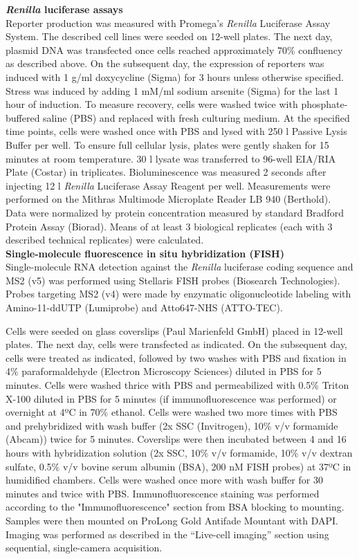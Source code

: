 \textbf{\textit{Renilla} luciferase assays} \\
Reporter production was measured with Promega’s \textit{Renilla} Luciferase Assay System.
The described cell lines were seeded on 12-well plates.
The next day, plasmid DNA was transfected once cells reached approximately 70\% confluency as described above.
On the subsequent day, the expression of reporters was induced with 1 \textmu g/ml
    doxycycline (Sigma) for 3 hours unless otherwise specified.
Stress was induced by adding 1 mM/ml sodium arsenite (Sigma) for the last 1 hour of induction.
To measure recovery, cells were washed twice with phosphate-buffered saline (PBS) and replaced with fresh culturing medium.
At the specified time points, cells were washed once with PBS and lysed with 250 \textmu l Passive Lysis Buffer per well.
To ensure full cellular lysis, plates were gently shaken for 15 minutes at room temperature.
30 \textmu l lysate was transferred to 96-well EIA/RIA Plate (Costar) in triplicates.
Bioluminescence was measured 2 seconds after injecting 12 \textmu l \textit{Renilla} Luciferase Assay Reagent per well.
Measurements were performed on the Mithras Multimode Microplate Reader LB 940 (Berthold).
Data were normalized by protein concentration measured by standard Bradford Protein Assay (Biorad).
Means of at least 3 biological replicates (each with 3 described technical replicates) were calculated.
\\

\textbf{Single-molecule fluorescence in situ hybridization (FISH)} \\
Single-molecule RNA detection against the \textit{Renilla} luciferase coding sequence and MS2 (v5) was performed using Stellaris FISH probes (Biosearch Technologies).
Probes targeting MS2 (v4) were made by enzymatic oligonucleotide labeling \cite{gaspar_rna_2018} with Amino-11-ddUTP (Lumiprobe) and Atto647-NHS (ATTO-TEC). 

Cells were seeded on glass coverslips (Paul Marienfeld GmbH) placed in 12-well plates.
The next day, cells were transfected as indicated.
On the subsequent day, cells were treated as indicated, followed by two washes with PBS and fixation in 4\% paraformaldehyde (Electron Microscopy Sciences) diluted in PBS for 5 minutes.
Cells were washed thrice with PBS and permeabilized with 0.5\% Triton X-100 diluted in PBS for 5 minutes (if immunofluorescence was performed) or overnight at 4ºC in 70\% ethanol.
Cells were washed two more times with PBS and prehybridized with wash buffer (2x SSC (Invitrogen), 10\% v/v formamide (Abcam)) twice for 5 minutes.
Coverslips were then incubated between 4 and 16 hours with hybridization solution (2x SSC, 10\% v/v formamide, 10\% v/v dextran sulfate, 0.5\% v/v bovine serum albumin (BSA), 200 nM FISH probes) at 37ºC in humidified chambers.
Cells were washed once more with wash buffer for 30 minutes and twice with PBS.
Immunofluorescence staining was performed according to the "Immunofluorescence" section from BSA blocking to mounting.
Samples were then mounted on ProLong Gold Antifade Mountant with DAPI.
Imaging was performed as described in the “Live-cell imaging” section using sequential, single-camera acquisition.
\\

